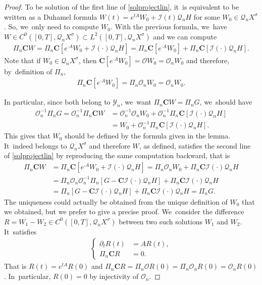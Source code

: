 \documentclass[11pt]{article}
\theoremstyle{definition}
\let\mc\mathcal
\renewcommand{\O}{\mc{O}}
\newcommand{\Q}{\mathcal{Q}}
\newcommand{\bC}{\boldsymbol{C}}
\begin{document}
\begin{proof}
To be solution of the first line of \eqref{solprojectlin}, it~is equivalent to be written as a Duhamel formula $W(t)=e^{tA}W_{0}+\mc{I}(t)\Q_nH$ for some $W_{0}\in \Q_{n}X^{\sigma}$. So, we~only need to compute $W_{0}$. With the previous formula, we~have $W\in C^{0}([0,T],\Q_{n}X^{\sigma})\subset L^{2}([0,T],\Q_{n}X^{\sigma})$ and we can compute
\begin{align*}
\Pi_n\bC W= \Pi_n\bC \left[e^{\cdot A}W_{0}+\mc{I}(\cdot)\Q_nH \right]=\Pi_n\bC \left[e^{\cdot A}W_{0} \right]+\Pi_n\bC \left[\mc{I}(\cdot)\Q_nH \right].
\end{align*}
Note that if $W_{0}\in \Q_{n}X^{\sigma}$, then $\bC\left[e^{\cdot A}W_{0}\right]=\O W_{0}=\O_{n} W_{0}$ and therefore, by~definition of $\Pi_{n}$,
\begin{align*}
\Pi_{n}\bC\left[e^{\cdot A}W_{0}\right]=\Pi_{n}\O_{n} W_{0}=\O_{n} W_{0}.
\end{align*}

In particular, since both belong to $\mathcal{Y}_n$, we~want $ \Pi_n\bC W=\Pi_{n}G$, we~should have
\begin{align*}
\O_n^{-1}\Pi_{n}G= \O_n^{-1} \Pi_n\bC W &=\O_n^{-1}\O_{n} W_{0}+\O_n^{-1}\Pi_n\bC \left[\mc{I}(\cdot)\Q_nH \right]\\ &=W_{0}+\O_n^{-1}\Pi_n\bC[\mc{I}(\cdot)\Q_nH].
\end{align*}
This gives that $W_{0}$ should be defined by the formula given in the lemma. It~indeed belongs to $\Q_{n}X^{\sigma}$ and therefore $W$, as defined, satisfies the second line of \eqref{solprojectlin} by reproducing the same computation backward, that is\vspace*{-3pt}
\begin{align*}
\Pi_n\bC W&=\Pi_n\bC\left[e^{\cdot A}W_{0}+\mc{I}(\cdot)\Q_nH\right] =\Pi_{n} \O_{n}W_{0}+\Pi_n\bC\mc{I}(\cdot)\Q_nH\\
&=\Pi_{n} \O_{n}\O_n^{-1}\Pi_n\left[G-\bC\mc{I}(\cdot)\Q_n H\right]+\Pi_n\bC\mc{I}(\cdot)\Q_nH\\
&=\Pi_n\left[G-\bC\mc{I}(\cdot)\Q_n H\right]+\Pi_n\bC\mc{I}(\cdot)\Q_nH=\Pi_{n}G.
\end{align*}
The uniqueness could actually be obtained from the unique definition of $W_{0}$ that we obtained, but we prefer to give a precise proof. We~consider the difference $R=W_{1}-W_{2}\in C^{0}([0,T],\Q_{n}X^{\sigma})$ between two such solutions $W_{1}$ and $W_{2}$. It~satisfies\vspace*{-3pt}
\begin{align*}
\left\{\begin{array}{rl}
\partial_t R(t)&=AR(t), \\[3pt]
\Pi_n\bC R &=0.
\end{array}\right.
\end{align*}
That is $R(t)=e^{tA}R(0)$ and $\Pi_n\bC R=\Pi_{n}\O R(0)=\Pi_{n}\O_{n}R(0)=\O_{n}R(0)$. In~particular, $R(0)=0$ by injectivity of $\O_{n}$.


\end{proof}
\end{document}
